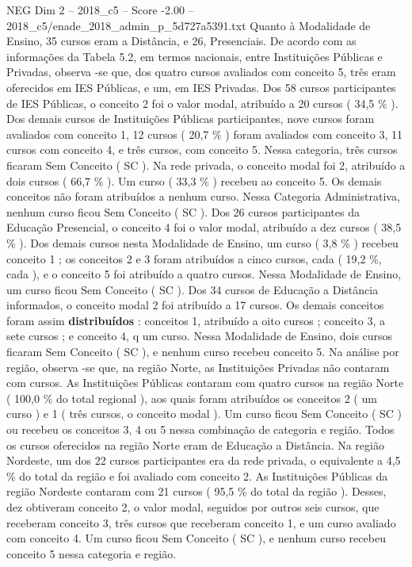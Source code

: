 \begin{textsample}{NEG Dim 2 – 2018\_c5 – Score -2.00 – 2018\_c5/enade\_2018\_admin\_p\_5d727a5391.txt}
Quanto à Modalidade de Ensino, 35 cursos eram a Distância, e 26, Presenciais.
De acordo com as informações da Tabela 5.2, em termos nacionais, entre Instituições Públicas e Privadas, observa -se que, dos quatro cursos avaliados com conceito 5, três eram oferecidos em IES Públicas, e um, em IES Privadas.
Dos 58 cursos participantes de IES Públicas, o conceito 2 foi o valor modal, atribuído a 20 cursos ( 34,5 \% ).
Dos demais cursos de Instituições Públicas participantes, nove cursos foram avaliados com conceito 1, 12 cursos ( 20,7 \% ) foram avaliados com conceito 3, 11 cursos com conceito 4, e três cursos, com conceito 5.
Nessa categoria, três cursos ficaram Sem Conceito ( SC ).
Na rede privada, o conceito modal foi 2, atribuído a dois cursos ( 66,7 \% ).
Um curso ( 33,3 \% ) recebeu ao conceito 5.
Os demais conceitos não foram atribuídos a nenhum curso.
Nessa Categoria Administrativa, nenhum curso ficou Sem Conceito ( SC ).
Dos 26 cursos participantes da Educação Presencial, o conceito 4 foi o valor modal, atribuído a dez cursos ( 38,5 \% ).
Dos demais cursos nesta Modalidade de Ensino, um curso ( 3,8 \% ) recebeu conceito 1 ; os conceitos 2 e 3 foram atribuídos a cinco cursos, cada ( 19,2 \%, cada ), e o conceito 5 foi atribuído a quatro cursos.
Nessa Modalidade de Ensino, um curso ficou Sem Conceito ( SC ).
Dos 34 cursos de Educação a Distância informados, o conceito modal 2 foi atribuído a 17 cursos.
Os demais conceitos foram assim \textbf{distribuídos} : conceitos 1, atribuído a oito cursos ; conceito 3, a sete cursos ; e conceito 4, q um curso.
Nessa Modalidade de Ensino, dois cursos ficaram Sem Conceito ( SC ), e nenhum curso recebeu conceito 5.
Na análise por região, observa -se que, na região Norte, as Instituições Privadas não contaram com cursos.
As Instituições Públicas contaram com quatro cursos na região Norte ( 100,0 \% do total regional ), aos quais foram atribuídos os conceitos 2 ( um curso ) e 1 ( três cursos, o conceito modal ).
Um curso ficou Sem Conceito ( SC ) ou recebeu os conceitos 3, 4 ou 5 nessa combinação de categoria e região.
Todos os cursos oferecidos na região Norte eram de Educação a Distância.
Na região Nordeste, um dos 22 cursos participantes era da rede privada, o equivalente a 4,5 \% do total da região e foi avaliado com conceito 2.
As Instituições Públicas da região Nordeste contaram com 21 cursos ( 95,5 \% do total da região ).
Desses, dez obtiveram conceito 2, o valor modal, seguidos por outros seis cursos, que receberam conceito 3, três cursos que receberam conceito 1, e um curso avaliado com conceito 4.
Um curso ficou Sem Conceito ( SC ), e nenhum curso recebeu conceito 5 nessa categoria e região.

\end{textsample}

